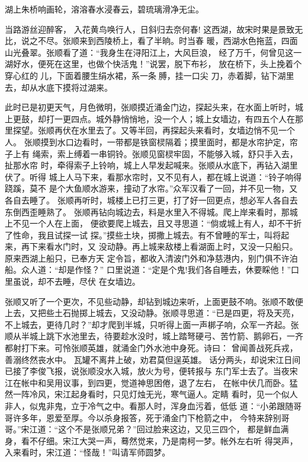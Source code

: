 湖上朱桥响画轮，溶溶春水浸春云，碧琉璃滑净无尘。

当路游丝迎醉客，
入花黄鸟唤行人，日斜归去奈何春!
这西湖，故宋时果是景致无比，说之不尽。张顺来到西陵桥上，看了半晌。时当春
暖，西湖水色拖蓝，四面山光叠翠。张顺看了道：“我身生在浔阳江上，大风巨浪，
经了万千，何曾见这一湖好水，便死在这里，也做个快活鬼！”说罢，脱下布衫，
放在桥下，头上挽着个穿心红的儿，下面着腰生绢水裙，系一条膊，挂一口尖
刀，赤着脚，钻下湖里去，却从水底下摸将过湖来。

此时已是初更天气，月色微明，张顺摸近涌金门边，探起头来，在水面上听时，城
上更鼓，却打一更四点。城外静悄悄地，没一个人；城上女墙边，有四五个人在那
里探望。张顺再伏在水里去了。又等半回，再探起头来看时，女墙边悄不见一个人。
张顺摸到水口边看时，一带都是铁窗棂隔着；摸里面时，都是水帘护定，帘子上有
绳索，索上缚着一串铜铃。张顺见窗棂牢固，不能够入城，舒只手入去，扯那水帘
时，牵得索子上铃响，城上人早发起喊来。张顺从水底下，再钻入湖里伏了。听得
城上人马下来，看那水帘时，又不见有人，都在城上说道：“铃子响得跷蹊，莫不
是个大鱼顺水游来，撞动了水帘。”众军汉看了一回，并不见一物，又各自去睡了。
张顺再听时，城楼上已打三更，打了好一回更点，想必军人各自去东倒西歪睡熟了。
张顺再钻向城边去，料是水里入不得城。爬上岸来看时，那城上不见一个人在上面，
便欲要爬上城去，且又寻思道：“倘或城上有人，却不干折了性命，我且试探一试
探。”摸些土块，掷撒上城去。有不曾睡的军士，叫将起来，再下来看水门时，又
没动静。再上城来敌楼上看湖面上时，又没一只船只。原来西湖上船只，已奉方天
定令旨，都收入清波门外和净慈港内，别门俱不许泊船。众人道：“却是作怪？”
口里说道：“定是个鬼!我们各自睡去，休要睬他！”口里虽说，却不去睡，尽伏
在女墙边。

张顺又听了一个更次，不见些动静，却钻到城边来听，上面更鼓不响。张顺不敢便
上去，又把些土石抛掷上城去，又没动静。张顺寻思道：“已是四更，将及天亮，
不上城去，更待几时？”却才爬到半城，只听得上面一声梆子响，众军一齐起。张
顺从半城上跳下水池里去，待要趁水没时，城上踏弩硬弓、苦竹箭、鹅卵石，一齐
都射打下来。可怜张顺英雄，就涌金门外水池中身死。诗曰：
曾闻善战死兵戎，善溺终然丧水中。
瓦罐不离井上破，劝君莫但逞英雄。
话分两头，却说宋江日间已接了李俊飞报，说张顺没水入城，放火为号，便转报与
东门军士去了。当夜宋江在帐中和吴用议事，到四更，觉道神思困倦，退了左右，
在帐中伏几而卧。猛然一阵冷风，宋江起身看时，只见灯烛无光，寒气逼人。定睛
看时，见一个似人非人，似鬼非鬼，立于冷气之中。看那人时，浑身血污着，低低
道：“小弟跟随哥哥许多年，恩爱至厚。今以杀身报答，死于涌金门下枪箭之中，
今特来辞别哥哥。”宋江道：“这个不是张顺兄弟？”回过脸来这边，又见三四个，
都是鲜血满身，看不仔细。宋江大哭一声，蓦然觉来，乃是南柯一梦。帐外左右听
得哭声，入来看时，宋江道：“怪哉！”叫请军师圆梦。

